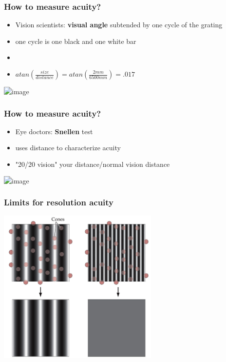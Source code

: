 \documentclass[]{beamer}
\begin{document}
\begin{frame}
\frametitle{How to measure acuity?}
\begin{overlayarea}{110mm}{60mm}
\begin{itemize} 
 \item Vision scientists: \textbf{visual angle} subtended by one cycle of the grating
 \item one cycle is one black and one white bar 
 \item[]
 \item $atan(\frac{size}{distance}) = atan(\frac{2mm}{6500mm})=.017$
\end{itemize}
  \begin{center}
\includegraphics<1>[width=80mm]{figs/l3/visual_angle.png}
 \end{center}
\end{overlayarea}
\end{frame}

\begin{frame}
\frametitle{How to measure acuity?}
\begin{overlayarea}{110mm}{60mm}
\begin{itemize} 
 \item Eye doctors: \textbf{Snellen} test 
 \item uses distance to characterize acuity
 \item "20/20 vision" your distance/normal vision distance
\end{itemize}
  \begin{center}
\includegraphics<1>[width=50mm]{figs/l3/snellen_E.png}
 \end{center}
\end{overlayarea}
\end{frame}

\begin{frame}
\frametitle{Limits for resolution acuity}
  \begin{center}
\includegraphics[width=80mm]{figs/l3/grating_sampling.png}
 \end{center}
\end{frame}
\end{document}
